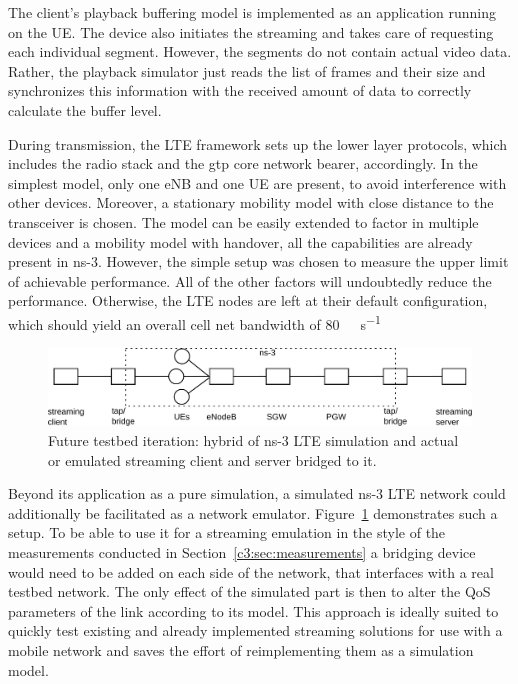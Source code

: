 The client's playback buffering model is implemented as an application running on the \gls{UE}. The device also initiates the streaming and takes care of requesting each individual segment. However, the segments do not contain actual video data. Rather, the playback simulator just reads the list of frames and their size and synchronizes this information with the received amount of data to correctly calculate the buffer level.

During transmission, the \gls{LTE} framework sets up the lower layer protocols, which includes the radio stack and the \gls{gtp} core network bearer, accordingly. In the simplest model, only one \gls{eNB} and one \gls{UE} are present, to avoid interference with other devices. Moreover, a stationary mobility model with close distance to the transceiver is chosen. The model can be easily extended to factor in multiple devices and a mobility model with handover, all the capabilities are already present in ns-3. However, the simple setup was chosen to measure the upper limit of achievable performance. All of the other factors will undoubtedly reduce the performance. Otherwise, the \gls{LTE} nodes are left at their default configuration, which should yield an overall cell net bandwidth of \SI{80}{\mega\bit\per\second}

\begin{figure}[htb]
\centering
\includegraphics[width=\textwidth]{images/streaming-hybrid.pdf}
\caption{Future testbed iteration: hybrid of ns-3 LTE simulation and actual or emulated streaming client and server bridged to it.}
\label{c6:fig:streaming-hybrid}
\end{figure}

Beyond its application as a pure simulation, a simulated ns-3 \gls{LTE} network could additionally be facilitated as a network emulator. Figure~\ref{c6:fig:streaming-hybrid} demonstrates such a setup. To be able to use it for a streaming emulation in the style of the measurements conducted in Section~\ref{c3:sec:measurements} a bridging device would need to be added on each side of the network, that interfaces with a real testbed network. The only effect of the simulated part is then to alter the \gls{QoS} parameters of the link according to its model. This approach is ideally suited to quickly test existing and already implemented streaming solutions for use with a mobile network and saves the effort of reimplementing them as a simulation model.


